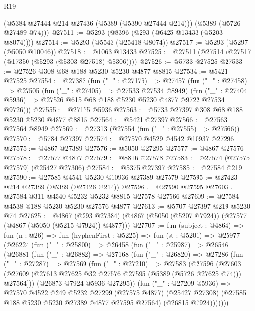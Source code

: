 \begin{lexlean}{R19}
\begin{coremodule}
      (@5384 @27444 @214 @27436 (@5389 (@5390 @27444 @214)))
      (@5389 (@5726 @27489 @74)))
@27511 := @5293 (@8396 (@293 (@6425 @13433 (@5203 @8074))))
@27514 := @5293 (@5543 (@25418 @8074))
@27517 := @5293 (@5297 (@5050 @10046))
@27518 := @1063 @13433
@27525 := @27511 (@27514 (@27517 (@17350 (@5293 (@5303 @27518) @5306))))
@27526 := @5733 @27525
@27533 := @27526 @308 @68 @188 @5230 @5230 @4877 @8815
@27534 := @5421 @27525
@27554 := @27383
    (fun ("_" : @27176) =>
    @27457
      (fun ("_" : @27458) =>
      @27505
        (fun ("_" : @27405) => @27533 @27534 @8949)
        (fun ("_" : @27404 @5936) => @27526 @615 @68 @188 @5230 @5230 @4877 @9722 @27534 @9726)))
@27555 := @27175 @5936
@27563 := @5733 @27397 @308 @68 @188 @5230 @5230 @4877 @8815
@27564 := @5421 @27397
@27566 := @27563 @27564 @8949
@27569 := @27313 (@27554 (fun ("_" : @27555) => @27566))
@27570 := @5784 @27397
@27574 := @27570 @4529 @4542 @10937 @27296
@27575 := @4867 @27389
@27576 := @5050 @27295
@27577 := @4867 @27576
@27578 := @27577 @4877
@27579 := @8816 @27578
@27583 := @27574 (@27575 @27579) (@25427 @27306)
@27584 := @5375 @27397
@27585 := @27584 @219
@27590 := @27585 @4541 @5230 @10936 @27389 @27579
@27595 := @27423 @214 @27389 (@5389 (@27426 @214))
@27596 := @27590 @27595
@27603 := @27584 @311 @4540 @5232 @5232 @8815 @27578 @27566
@27609 := @27584 @4538 @188 @5230 @5230 @27576 @4877
@27613 := @5707 @27397 @219 @5230 @74
@27625 := @4867
    (@293 @27384)
    (@4867 (@5050 (@5207 @7924)) (@27577 (@4867 (@5050 (@5215 @7924)) @4877)))
@27707 := fun (subject : @4864) =>
  fun (n : @26) =>
  fun (hyphenFirst : @5225) =>
  fun (st : @5201) =>
  @25977
    (@26224
      (fun ("_" : @25800) =>
      @26458
        (fun ("_" : @25987) =>
        @26546
          (@26881
            (fun ("_" : @26882) =>
            @27168
              (fun ("_" : @26820) =>
              @27286
                (fun ("_" : @27287) =>
                @27569
                  (fun ("_" : @27210) =>
                  @27583
                    (@27596
                      (@27603
                        (@27609
                          (@27613 @27625 @32 @27576 @27595 (@5389 (@5726 @27625 @74)))
                          @27564)))
                    (@26873 @7924 @5936 @27295))
                  (fun ("_" : @27209 @5936) =>
                  @27570
                    @4522
                    @249
                    @5232
                    @27299
                    (@27575 @4877)
                    (@25427 @27308)
                    (@27585 @188 @5230 @5230 @27389 @4877 @27595 @27564)
                    (@26815 @7924)))))))

\end{coremodule}
\end{lexlean}
